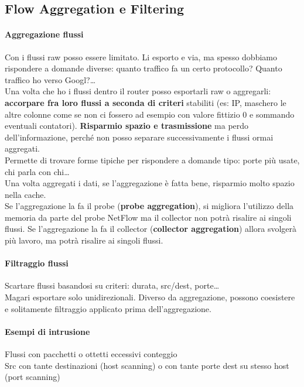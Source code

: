 \documentclass[10pt]{book}
\begin{document}
\subsection{Flow Aggregation e Filtering}
\paragraph{Aggregazione flussi} Con i flussi raw posso essere limitato. Li esporto e via, ma spesso dobbiamo rispondere a domande diverse: quanto traffico fa un certo protocollo? Quanto traffico ho verso Googl?\ldots\\
Una volta che ho i flussi dentro il router posso esportarli raw o aggregarli: \textbf{accorpare fra loro flussi a seconda di criteri} stabiliti (es: IP, maschero le altre colonne come se non ci fossero ad esempio con valore fittizio 0 e sommando eventuali contatori). \textbf{Risparmio spazio e trasmissione} ma perdo dell'informazione, perché non posso separare successivamente i flussi ormai aggregati.\\
Permette di trovare forme tipiche per rispondere a domande tipo: porte più usate, chi parla con chi\ldots\\
Una volta aggregati i dati, se l'aggregazione è fatta bene, risparmio molto spazio nella cache.\\
Se l'aggregazione la fa il probe (\textbf{probe aggregation}), si migliora l'utilizzo della memoria da parte del probe NetFlow ma il collector non potrà risalire ai singoli flussi. Se l'aggregazione la fa il collector (\textbf{collector aggregation}) allora svolgerà più lavoro, ma potrà risalire ai singoli flussi.
\paragraph{Filtraggio flussi} Scartare flussi basandosi su criteri: durata, src/dest, porte\ldots\\
Magari esportare solo unidirezionali. Diverso da aggregazione, possono coesistere e solitamente filtraggio applicato prima dell'aggregazione.
\paragraph{Esempi di intrusione} Flussi con pacchetti o ottetti eccessivi conteggio\\Src con tante destinazioni (host scanning) o con tante porte dest su stesso host (port scanning)
\end{document}
